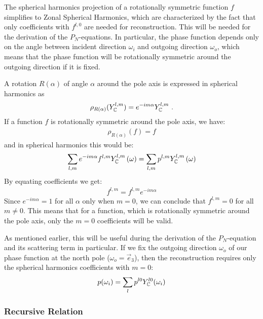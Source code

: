 The spherical harmonics projection of a rotationally symmetric function $f$ simplifies to Zonal Spherical Harmonics, which are characterized by the fact that only coefficients with $f^{l,0}$ are needed for reconstruction. This will be needed for the derivation of the $P_N$-equations. In particular, the phase function depends only on the angle between incident direction $\omega_i$ and outgoing direction $\omega_o$, which means that the phase function will be rotationally symmetric around the outgoing direction if it is fixed. 

A rotation $R(\alpha)$ of angle $\alpha$ around the pole axis is expressed in spherical harmonics as
\begin{align*}
\rho_{R(\alpha)}(Y_{\mathbb{C}}^{l,m}) = e^{-i m\alpha}Y_{\mathbb{C}}^{l,m}
\ .
\end{align*}
If a function $f$ is rotationally symmetric around the pole axis, we have:
\begin{align*}
\rho_{R(\alpha)}(f) = f
\end{align*}
and in spherical harmonics this would be:
\begin{align*}
\sum_{l,m}
{
e^{-i m\alpha}
f^{l,m}
Y_{\mathbb{C}}^{l,m} }\left(\omega\right)
=
\sum_{l,m}
{
p^{l,m}
Y_{\mathbb{C}}^{l,m}\left(\omega\right)
}
\end{align*}
By equating coefficients we get:
\begin{align*}
f^{l,m} = f^{l,m}e^{-i m\alpha}
\end{align*}
Since $e^{-i m\alpha}=1$ for all $\alpha$ only when $m=0$, we can conclude that $f^{l,m} = 0$ for all $m\ne0$. This means that for a function, which is rotationally symmetric around the pole axis, only the $m=0$ coefficients will be valid.

As mentioned earlier, this will be useful during the derivation of the $P_N$-equation and its scattering term in particular. If we fix the outgoing direction $\omega_o$ of our phase function at the north pole ($\omega_o=\vec{e}_3$), then the reconstruction requires only the spherical harmonics coefficients with $m=0$:
\begin{align}
\label{eq:sh_exp_phase}
p(\omega_i) =
\sum_l
{
p^{l0}
Y_{\mathbb{C}}^{l0}(\omega_i)
}
\end{align}

\subsubsection*{Recursive Relation}

